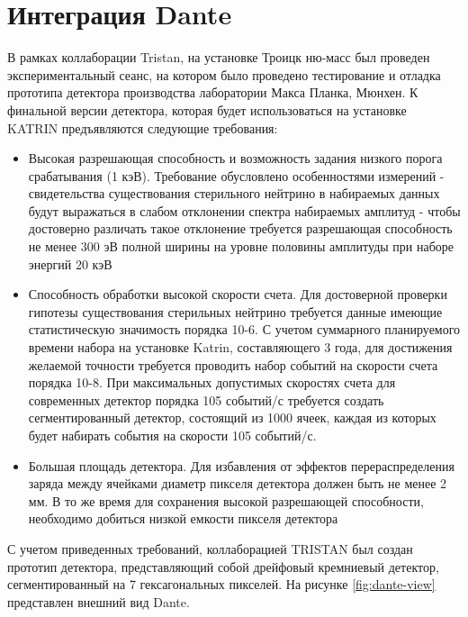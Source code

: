 \documentclass[a4paper,14pt]{extreport}
\begin{document}
\section{Интеграция Dante}

В рамках коллаборации Tristan, на установке Троицк ню-масс был проведен экспериментальный сеанс, на котором было проведено тестирование и отладка прототипа детектора производства лаборатории Макса Планка, Мюнхен\cite{1801.08182}. К финальной версии детектора, которая будет использоваться на установке KATRIN предъявляются следующие требования:

\begin{itemize}
    \item Высокая разрешающая способность и возможность задания низкого порога срабатывания (1 кэВ). Требование обусловлено особенностями измерений - свидетельства существования стерильного нейтрино в набираемых данных будут выражаться в слабом отклонении спектра набираемых амплитуд - чтобы достоверно различать такое отклонение требуется разрешающая способность не менее 300 эВ полной ширины на уровне половины амплитуды при наборе энергий 20 кэВ
    \item Способность обработки высокой скорости счета. Для достоверной проверки гипотезы существования стерильных нейтрино требуется данные имеющие статистическую значимость порядка 10-6. С учетом суммарного планируемого времени набора на установке Katrin, составляющего 3 года, для достижения желаемой точности требуется проводить набор событий на скорости счета порядка 10-8. При максимальных допустимых скоростях счета для современных детектор порядка 105 событий/с требуется создать сегментированный детектор, состоящий из 1000 ячеек, каждая из которых будет набирать события на скорости 105 событий/с.
    \item Большая площадь детектора. Для избавления от эффектов перераспределения заряда между ячейками диаметр пикселя детектора должен быть не менее 2 мм. В то же время для сохранения высокой разрешающей способности, необходимо добиться низкой емкости пикселя детектора
\end{itemize}
С учетом приведенных требований, коллаборацией TRISTAN был создан прототип детектора, представляющий собой дрейфовый кремниевый детектор, сегментированный на 7 гексагональных пикселей. На рисунке \ref{fig:dante-view} представлен внешний вид Dante.
\end{document}
